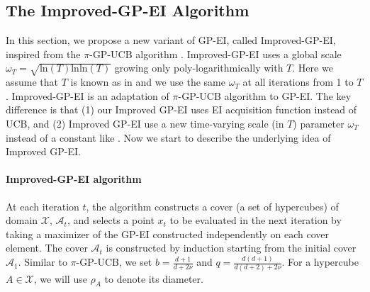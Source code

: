 \documentclass[twoside]{article}
\begin{document}
\subsection{The Improved-GP-EI Algorithm}
In this section, we propose a new variant of GP-EI, called Improved-GP-EI, inspired from the $\pi$-GP-UCB algorithm \citep{janz20a}. Improved-GP-EI uses a global scale $\omega_T = \sqrt{\text{ln}(T)\text{ln} \text{ln}(T)}$ growing only poly-logarithmically with $T$. Here we assume that $T$ is known as in \citep{janz20a} and we use the same $\omega_T$ at all iterations from 1 to $T$. Improved-GP-EI is an adaptation of $\pi$-GP-UCB algorithm \citep{janz20a} to GP-EI. The key difference is that (1) our Improved GP-EI uses EI acquisition function instead of UCB, and (2) Improved GP-EI use a new time-varying scale (in $T$) parameter $\omega_T$ instead of a constant like \citep{janz20a}. Now we start to describe the underlying idea of Improved GP-EI.
\paragraph{Improved-GP-EI algorithm}
At each iteration $t$, the algorithm constructs a cover (a set of hypercubes) of domain $\mathcal X$, $\mathcal A_t$, and selects a point $x_t$ to be evaluated in the next iteration by taking a maximizer of the GP-EI constructed independently on each cover element. The cover $\mathcal A_t$ is constructed by induction starting from the initial cover $\mathcal A_1$. Similar to $\pi$-GP-UCB,  we set $b = \frac{d+1}{d + 2\nu}$ and $q = \frac{d(d+1)}{d(d+2) + 2\nu}$. For a hypercube $A \in \mathcal X$, we will use $\rho_A$ to denote its diameter.
\end{document}
